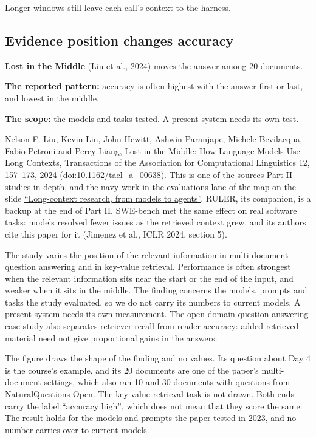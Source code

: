 \begin{takeaway}Longer windows still leave each call's context to the harness.\end{takeaway}

\subsection{Evidence position changes accuracy}
\label{sec:it-6-1}

\bi
\item \textbf{Lost in the Middle} (Liu et al., 2024) moves the answer among 20 documents.
\item \textbf{The reported pattern:} accuracy is often highest with the answer first or last, and lowest in the middle.
\item \textbf{The scope:} the models and tasks tested. A present system needs its own test.
\ei

Nelson F. Liu, Kevin Lin, John Hewitt, Ashwin Paranjape, Michele Bevilacqua, Fabio Petroni and Percy Liang, Lost in the Middle: How Language Models Use Long Contexts, Transactions of the Association for Computational Linguistics 12, 157--173, 2024 (doi:10.1162/tacl\_a\_00638). This is one of the sources Part II studies in depth, and the navy work in the evaluations lane of the map on the slide \hyperref[sec:it-6-0]{``Long-context research, from models to agents''}. RULER, its companion, is a backup at the end of Part II. SWE-bench met the same effect on real software tasks: models resolved fewer issues as the retrieved context grew, and its authors cite this paper for it (Jimenez et al., ICLR 2024, section 5).

The study varies the position of the relevant information in multi-document question answering and in key-value retrieval. Performance is often strongest when the relevant information sits near the start or the end of the input, and weaker when it sits in the middle. The finding concerns the models, prompts and tasks the study evaluated, so we do not carry its numbers to current models. A present system needs its own measurement. The open-domain question-answering case study also separates retriever recall from reader accuracy: added retrieved material need not give proportional gains in the answers.

The figure draws the shape of the finding and no values. Its question about Day 4 is the course's example, and its 20 documents are one of the paper's multi-document settings, which also ran 10 and 30 documents with questions from NaturalQuestions-Open. The key-value retrieval task is not drawn. Both ends carry the label ``accuracy high'', which does not mean that they score the same. The result holds for the models and prompts the paper tested in 2023, and no number carries over to current models.

